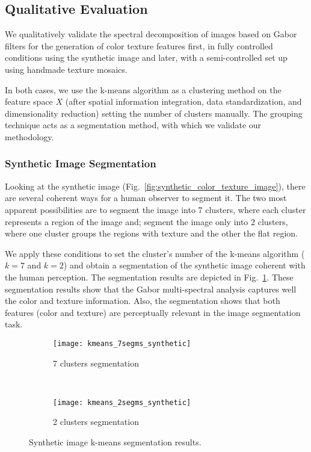 \subsection{Qualitative Evaluation}
We qualitatively validate the spectral decomposition of images based on Gabor filters for the generation of color texture features first, in fully controlled conditions using the synthetic image and later, with a semi-controlled set up using handmade texture mosaics.

In both cases, we use the k-means algorithm as a clustering method on the feature space $X$ (after spatial information integration, data standardization, and dimensionality reduction) setting the number of clusters manually. The grouping technique acts as a segmentation method, with which we validate our methodology.

\subsubsection{Synthetic Image Segmentation}
Looking at the synthetic image (Fig.\ \ref{fig:synthetic_color_texture_image}),  there are several coherent ways for a human observer to segment it. The two most apparent possibilities are to segment the image into 7 clusters, where each cluster represents a region of the image and; segment the image only into 2 clusters, where one cluster groups the regions with texture and the other the flat region. 

We apply these conditions to set the cluster's number of the k-means algorithm ($k = 7$ and $k = 2$) and obtain a segmentation of the synthetic image coherent with the human perception. The segmentation results are depicted in Fig.\  \ref{fig:kmeans_segms_synthetic_img}. These segmentation results show that the Gabor multi-spectral analysis captures well the color and texture information. Also, the segmentation shows that both features (color and texture) are perceptually relevant in the image segmentation task.  

\begin{figure}[!ht]
    \centering
    \begin{subfigure}[b]{\textwidth}
        \texttt{[image: kmeans\_7segms\_synthetic]}
        \caption{7 clusters segmentation}
    \end{subfigure} \\    
    \begin{subfigure}[b]{\textwidth}
    	\texttt{[image: kmeans\_2segms\_synthetic]}
        \caption{2 clusters segmentation}
    \end{subfigure} 
        	    
    \caption{Synthetic image k-means segmentation results.}\label{fig:kmeans_segms_synthetic_img}    
\end{figure}

